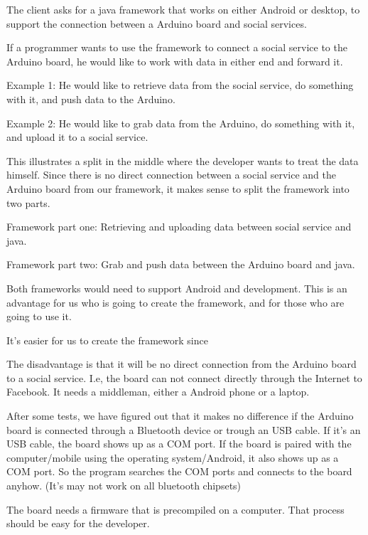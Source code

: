 The client asks for a java framework that works on either Android or desktop, to support the connection between a Arduino board and social services.

If a programmer wants to use the framework to connect a social service to the Arduino board, he would like to work with data in either end and forward it.

Example 1:
He would like to retrieve data from the social service, do something with it, and push data to the Arduino.

Example 2:
He would like to grab data from the Arduino, do something with it, and upload it to a social service.

This illustrates a split in the middle where the developer wants to treat the data himself. Since there is no direct connection between a social service and the Arduino board from our framework, it makes sense to split the framework into two parts.

Framework part one: Retrieving and uploading data between social service and java.

Framework part two: Grab and push data between the Arduino board and java.

Both frameworks would need to support Android and development. This is an advantage for us who is going to create the framework, and for those who are going to use it.

It's easier for us to create the framework since

The disadvantage is that it will be no direct connection from the Arduino board to a social service.
I.e, the board can not connect directly through the Internet to Facebook. It needs a middleman, either a Android phone or a laptop.



After some tests, we have figured out that it makes no difference if the Arduino board is connected through a Bluetooth device or trough an USB cable. If it's an USB cable, the board shows up as a COM port. If the board is paired with the computer/mobile using the operating system/Android, it also shows up as a COM port. So the program searches the COM ports and connects to the board anyhow. (It's may not work on all bluetooth chipsets)


The board needs a firmware that is precompiled on a computer.
That process should be easy for the developer.


